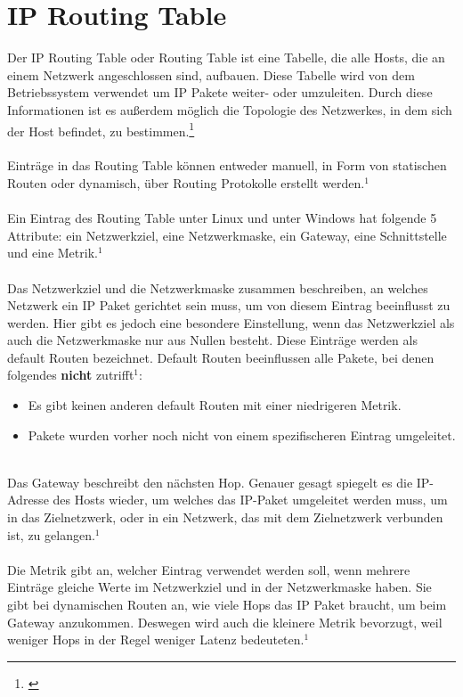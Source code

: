 \section{IP Routing Table}
Der IP Routing Table oder Routing Table ist eine Tabelle, die alle Hosts, die an einem Netzwerk angeschlossen sind, aufbauen. Diese Tabelle wird von dem Betriebssystem verwendet um IP Pakete weiter- oder umzuleiten. Durch diese Informationen ist es außerdem möglich die Topologie des Netzwerkes, in dem sich der Host befindet, zu bestimmen.\footnote[1]{\cite[Vgl.][]{2}}
\\\\
Einträge in das Routing Table können entweder manuell, in Form von statischen Routen oder dynamisch, über Routing Protokolle erstellt werden.$^{1}$
\\\\
Ein Eintrag des Routing Table unter Linux und unter Windows hat folgende 5 Attribute: ein Netzwerkziel, eine Netzwerkmaske, ein Gateway, eine Schnittstelle und eine Metrik.$^{1}$
\\\\
Das Netzwerkziel und die Netzwerkmaske zusammen beschreiben, an welches Netzwerk ein IP Paket gerichtet sein muss, um von diesem Eintrag beeinflusst zu werden. Hier gibt es jedoch eine besondere Einstellung, wenn das Netzwerkziel als auch die Netzwerkmaske nur aus Nullen besteht. Diese Einträge werden als default Routen bezeichnet. Default Routen beeinflussen alle Pakete, bei denen folgendes \textbf{nicht} zutrifft$^{1}$: 
\\
\begin{itemize}
    \item Es gibt keinen anderen default Routen mit einer niedrigeren Metrik.
    \item Pakete wurden vorher noch nicht von einem spezifischeren Eintrag umgeleitet.
\end{itemize}
\ \\
Das Gateway beschreibt den nächsten Hop. Genauer gesagt spiegelt es die IP-Adresse des Hosts wieder, um welches das IP-Paket umgeleitet werden muss, um in das Zielnetzwerk, oder in ein Netzwerk, das mit dem Zielnetzwerk verbunden ist, zu gelangen.$^{1}$
\\\\
Die Metrik gibt an, welcher Eintrag verwendet werden soll, wenn mehrere Einträge gleiche Werte im Netzwerkziel und in der Netzwerkmaske haben. Sie gibt bei dynamischen Routen an, wie viele Hops das IP Paket braucht, um beim Gateway anzukommen. Deswegen wird auch die kleinere Metrik bevorzugt, weil weniger Hops in der Regel weniger Latenz bedeuteten.$^{1}$
